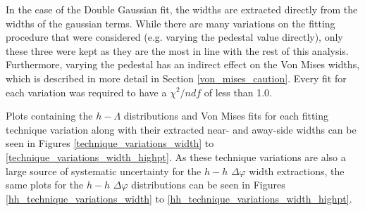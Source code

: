 \documentclass[ALICE,manyauthors]{ALICE_analysis_notes}
\begin{document}
In the case of the Double Gaussian fit, the widths are extracted directly from the widths of the gaussian terms. While there are many variations on the fitting procedure that were considered (e.g. varying the pedestal value directly), only these three were kept as they are the most in line with the rest of this analysis. Furthermore, varying the pedestal has an indirect effect on the Von Mises widths, which is described in more detail in Section \ref{von_mises_caution}. Every fit for each variation was required to have a $\chi^{2}/ndf$ of less than 1.0.

Plots containing the $h-\Lambda$ distributions and Von Mises fits for each fitting technique variation along with their extracted near- and away-side widths can be seen in Figures \ref{technique_variations_width} to \ref{technique_variations_width_highpt}. As these technique variations are also a large source of systematic uncertainty for the $h-h$ $\Delta\varphi$ width extractions, the same plots for the $h-h$ $\Delta\varphi$ distributions can be seen in Figures \ref{hh_technique_variations_width} to \ref{hh_technique_variations_width_highpt}.
\end{document}
